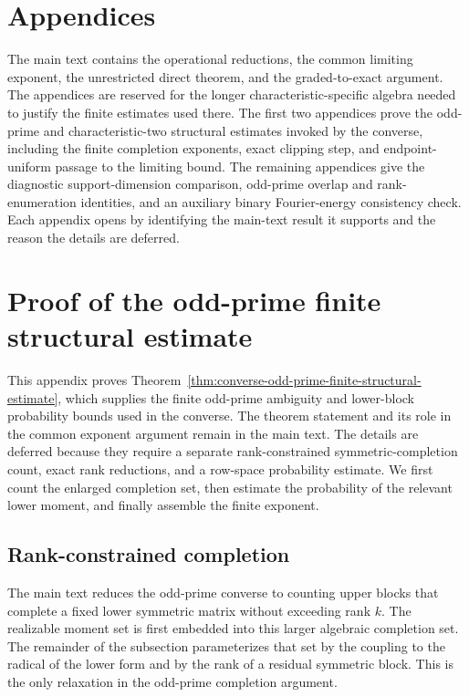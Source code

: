 \documentclass[11pt]{article}
\newcommand{\1}{\mathbf 1}
\theoremstyle{plain}
\theoremstyle{definition}
\theoremstyle{remark}
\begin{document}
\appendix

\section*{Appendices}

The main text contains the operational reductions, the common limiting
exponent, the unrestricted direct theorem, and the graded-to-exact argument.
The appendices are reserved for the longer characteristic-specific algebra
needed to justify the finite estimates used there.  The first two appendices
prove the odd-prime and characteristic-two structural estimates invoked by the
converse, including the finite completion exponents, exact clipping step, and
endpoint-uniform passage to the limiting bound.  The remaining appendices
give the diagnostic support-dimension comparison, odd-prime overlap and
rank-enumeration identities, and an auxiliary binary Fourier-energy
consistency check.  Each appendix opens
by identifying the main-text result it supports and the reason the details are
deferred.

\section{Proof of the odd-prime finite structural estimate}
\label{app:odd-prime-finite-structural-proof}
This appendix proves Theorem~\ref{thm:converse-odd-prime-finite-structural-estimate}, which supplies the finite odd-prime ambiguity and lower-block probability bounds used in the converse.  The theorem statement and its role in the common exponent argument remain in the main text.  The details are deferred because they require a separate rank-constrained symmetric-completion count, exact rank reductions, and a row-space probability estimate.  We first count the enlarged completion set, then estimate the probability of the relevant lower moment, and finally assemble the finite exponent.

\subsection{Rank-constrained completion}
The main text reduces the odd-prime converse to counting upper blocks that complete a fixed lower symmetric matrix without exceeding rank $k$.  The realizable moment set is first embedded into this larger algebraic completion set.  The remainder of the subsection parameterizes that set by the coupling to the radical of the lower form and by the rank of a residual symmetric block.  This is the only relaxation in the odd-prime completion argument.
\label{sec:singular-completion}
\end{document}
